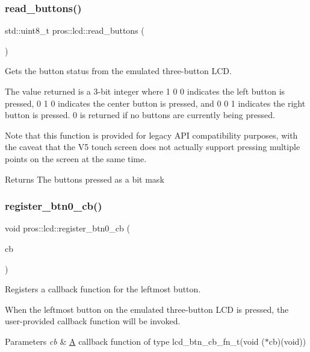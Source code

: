 \subsubsection{\texorpdfstring{read\_buttons()}{read\_buttons()}}
{\footnotesize\ttfamily std\+::uint8\+\_\+t pros\+::lcd\+::read\+\_\+buttons (\begin{DoxyParamCaption}\item[{void}]{ }\end{DoxyParamCaption})}



Gets the button status from the emulated three-\/button L\+CD. 

The value returned is a 3-\/bit integer where 1 0 0 indicates the left button is pressed, 0 1 0 indicates the center button is pressed, and 0 0 1 indicates the right button is pressed. 0 is returned if no buttons are currently being pressed.

Note that this function is provided for legacy A\+PI compatibility purposes, with the caveat that the V5 touch screen does not actually support pressing multiple points on the screen at the same time.

\begin{DoxyReturn}{Returns}
The buttons pressed as a bit mask 
\end{DoxyReturn}
\mbox{\label{namespacepros_1_1lcd_a4d8f5121ac67ae7de816334e7b66f08d}} 
\subsubsection{\texorpdfstring{register\_btn0\_cb()}{register\_btn0\_cb()}}
{\footnotesize\ttfamily void pros\+::lcd\+::register\+\_\+btn0\+\_\+cb (\begin{DoxyParamCaption}\item[{\mbox{\hyperlink{namespacepros_1_1lcd_ab5c0cdcf37795ff2a9dcaf546b087dd4}{lcd\+\_\+btn\+\_\+cb\+\_\+fn\+\_\+t}}}]{cb }\end{DoxyParamCaption})}



Registers a callback function for the leftmost button. 

When the leftmost button on the emulated three-\/button L\+CD is pressed, the user-\/provided callback function will be invoked.


\begin{DoxyParams}{Parameters}
{\em cb} & \mbox{\hyperlink{structA}{A}} callback function of type lcd\+\_\+btn\+\_\+cb\+\_\+fn\+\_\+t(void ($\ast$cb)(void)) \\
\hline
\end{DoxyParams}
\mbox{\label{namespacepros_1_1lcd_a9a3a9342268b8a95d91190ab36574a0a}} 
